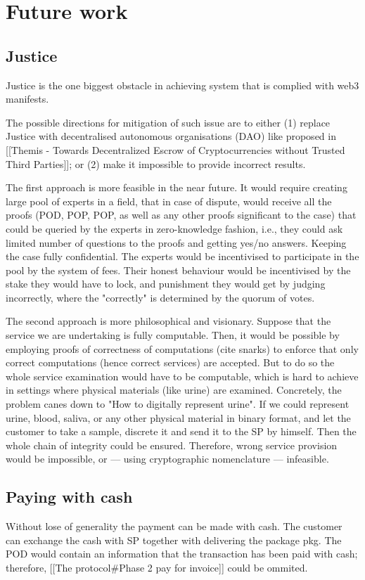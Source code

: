 \documentclass{article}
\begin{document}
\section{Future work}

\subsection{Justice}
Justice is the one biggest obstacle in achieving system that is complied with web3 manifests. 

The possible directions for mitigation of such issue are to either (1) replace Justice with decentralised autonomous organisations (DAO) like proposed in [[Themis - Towards Decentralized Escrow of Cryptocurrencies without Trusted Third Parties]]; or (2) make it impossible to provide incorrect results.

The first approach is more feasible in the near future. It would require creating large pool of experts in a field, that in case of dispute, would receive all the proofs (POD, POP, POP, as well as any other proofs significant to the case) that could be queried by the experts in zero-knowledge fashion, i.e., they could ask limited number of questions to the proofs and getting yes/no answers. Keeping the case fully confidential. The experts would be incentivised to participate in the pool by the system of fees. Their honest behaviour would be incentivised by the stake they would have to lock, and punishment they would get by judging incorrectly, where the "correctly" is determined by the quorum of votes.

The second approach is more philosophical and visionary. Suppose that the service we are undertaking is fully computable. Then, it would be possible by employing proofs of correctness of computations (cite snarks) to enforce that only correct computations (hence correct services) are accepted. But to do so the whole service examination would have to be computable, which is hard to achieve in settings where physical materials (like urine) are examined. Concretely, the problem canes down to "How to digitally represent urine". If we could represent urine, blood, saliva, or any other physical material in binary format, and let the customer to take a sample, discrete it and send it to the SP by himself. Then the whole chain of integrity could be ensured. Therefore, wrong service provision would be impossible, or — using cryptographic nomenclature — infeasible. 

\subsection{Paying with cash}
Without lose of generality the payment can be made with cash. 
The customer can exchange the cash with SP together with delivering the package pkg. The POD would contain an information that the transaction has been paid with cash; therefore, [[The protocol#Phase 2 pay for invoice]] could be ommited. 
\end{document}

